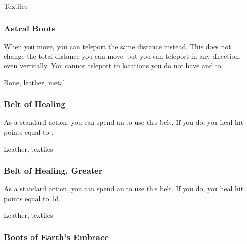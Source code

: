  Textiles


\lowercase{\hypertarget{item:Astral Boots}{}}\label{item:Astral Boots}
\hypertarget{item:Astral Boots}{\subsubsection{Astral Boots\hfill{}}}

When you move, you can teleport the same distance instead.
This does not change the total distance you can move, but you can teleport in any direction, even vertically.
You cannot teleport to locations you do not have  and  to.



 


 Bone, leather, metal


\lowercase{\hypertarget{item:Belt of Healing}{}}\label{item:Belt of Healing}
\hypertarget{item:Belt of Healing}{\subsubsection{Belt of Healing\hfill{}}}

As a standard action, you can spend an  to use this belt.
If you do, you heal hit points equal to .



 


 Leather, textiles


\lowercase{\hypertarget{item:Belt of Healing, Greater}{}}\label{item:Belt of Healing, Greater}
\hypertarget{item:Belt of Healing, Greater}{\subsubsection{Belt of Healing, Greater\hfill{}}}

As a standard action, you can spend an  to use this belt.
If you do, you heal hit points equal to  \plus1d.



 


 Leather, textiles


\lowercase{\hypertarget{item:Boots of Earth's Embrace}{}}\label{item:Boots of Earth's Embrace}
\hypertarget{item:Boots of Earth's Embrace}{\subsubsection{Boots of Earth's Embrace\hfill{}}}


